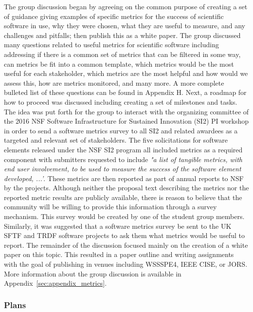 The group discussion began by agreeing on the common purpose of creating a set of guidance giving examples of specific metrics for the success of scientific 
software in use, why they were chosen, what they are useful to measure, and any challenges and pitfalls; then publish this as a white paper. 
 The group discussed many questions related to useful metrics for scientific software including addressing if there is a common set of metrics that 
 can be filtered in some way, can metrics be fit into a common template, which metrics would be the most useful for each stakeholder, 
 which metrics are the most helpful and how would we assess this, how are metrics monitored, and many more.  
 A more complete bulleted list of these questions can be found in Appendix H.  Next, a roadmap for how to proceed was discussed including
 creating a set of milestones and tasks.  The idea was put forth for the group to interact with the organizing committee of the 2016 NSF Software Infrastructure
  for Sustained Innovation (SI2) PI workshop in order to send a software metrics survey to all SI2 and related awardees as a targeted and relevant set of stakeholders.  
 The five solicitations for software elements released  under the NSF SI2 program all included metrics as a required component with submitters requested to include 
 {\it "a list of tangible metrics, with end user involvement, to be used to measure the success of the software element developed, ...'}. These metrics are then reported as part of annual reports to NSF by the projects. Although neither the proposal text describing the metrics nor the reported metric results are publicly available, there is reason to believe that the community will be willing to provide this information through a survey mechanism. 
This survey would be created by one of the student group members.  Similarly, it was suggested that a software metrics survey be sent to the 
UK SFTF and TRDF software projects to ask them what metrics would be useful to report.  The remainder of the discussion focused mainly on the 
creation of a white paper on this topic.  This resulted in a paper outline and writing assignments with the goal of publishing in venues including 
WSSSPE4, IEEE CISE, or JORS. More information about the group discussion is available in Appendix~\ref{sec:appendix_metrics}.

\subsubsection{Plans}

